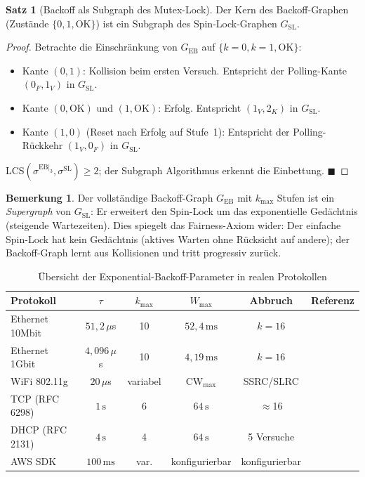 ﻿\documentclass[a4paper,12pt]{article}
\theoremstyle{definition}
\newtheorem{satz}{Satz}
\newtheorem{bemerkung}{Bemerkung}
\begin{document}
\begin{satz}[Backoff als Subgraph des Mutex-Lock]
\label{satz:backoff_subgraph}
Der Kern des Backoff-Graphen (Zustände $\{0, 1, \mathrm{OK}\}$)
ist ein Subgraph des Spin-Lock-Graphen $G_{\mathrm{SL}}$.
\end{satz}

\begin{proof}
Betrachte die Einschränkung von $G_{\mathrm{EB}}$ auf
$\{k=0, k=1, \mathrm{OK}\}$:
\begin{itemize}
  \item Kante $(0, 1)$: Kollision beim ersten Versuch. Entspricht
        der Polling-Kante $(0_F, 1_V)$ in $G_{\mathrm{SL}}$.
  \item Kante $(0, \mathrm{OK})$ und $(1, \mathrm{OK})$:
        Erfolg. Entspricht $(1_V, 2_K)$ in $G_{\mathrm{SL}}$.
  \item Kante $(1, 0)$ (Reset nach Erfolg auf Stufe~1):
        Entspricht der Polling-Rückkehr $(1_V, 0_F)$ in
        $G_{\mathrm{SL}}$.
\end{itemize}
LCS$(\sigma^{\mathrm{EB}|_3}, \sigma^{\mathrm{SL}}) \geq 2$;
der Subgraph Algorithmus erkennt die Einbettung.
\hfill$\blacksquare$
\end{proof}

\begin{bemerkung}
Der vollständige Backoff-Graph $G_{\mathrm{EB}}$ mit $k_{\max}$
Stufen ist ein \emph{Supergraph} von $G_{\mathrm{SL}}$: Er erweitert
den Spin-Lock um das exponentielle Gedächtnis (steigende Wartezeiten).
Dies spiegelt das Fairness-Axiom wider:
Der einfache Spin-Lock hat kein Gedächtnis (aktives Warten ohne
Rücksicht auf andere); der Backoff-Graph lernt aus Kollisionen
und tritt progressiv zurück.
\end{bemerkung}

\begin{table}[H]
\centering
\caption{Übersicht der Exponential-Backoff-Parameter in
  realen Protokollen}
\label{tab:backoff_protokolle}
\begin{tabular}{lccccl}
  \toprule
  Protokoll & $\tau$ & $k_{\max}$ & $W_{\max}$ & Abbruch & Referenz \\
  \midrule
  Ethernet 10Mbit & $51{,}2\,\mu$s & 10 & $52{,}4\,\mathrm{ms}$ & $k=16$ & \cite{metcalfe1976ethernet} \\
  Ethernet 1Gbit & $4{,}096\,\mu$s & 10 & $4{,}19\,\mathrm{ms}$ & $k=16$ & \cite{ieee8023} \\
  WiFi 802.11g & $20\,\mu$s & variabel & CW$_{\max}$ & SSRC/SLRC & \cite{ieee80211} \\
  TCP (RFC 6298) & $1\,\mathrm{s}$ & 6 & $64\,\mathrm{s}$ & $\approx$16 & \cite{rfc6298} \\
  DHCP (RFC 2131) & $4\,\mathrm{s}$ & 4 & $64\,\mathrm{s}$ & 5 Versuche & \cite{rfc2131} \\
  AWS SDK & $100\,\mathrm{ms}$ & var. & konfigurierbar & konfigurierbar & \cite{amazon2022backoff} \\
  \bottomrule
\end{tabular}
\end{table}
\end{document}
